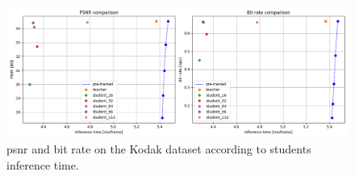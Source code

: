 \begin{figure}
    \centering
    \includegraphics[width=15cm]{img/kd_lic_time.png}
    \caption[\acrshort{psnr} and bit rate on the Kodak dataset according to students inference time.]{\acrshort{psnr} and bit rate on the Kodak dataset according to students inference time.}
    \label{appendix:kd_lic_time}
\end{figure}

